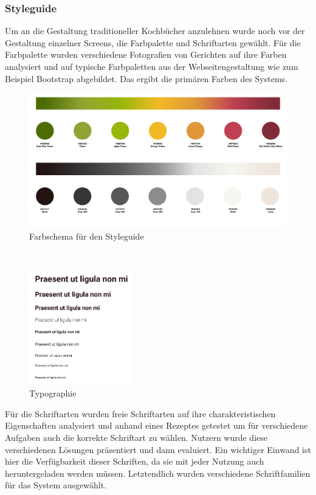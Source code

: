 \subsubsection{Styleguide}
Um an die Gestaltung traditioneller Kochbücher anzulehnen wurde noch vor der Gestaltung einzelner Screens, die Farbpalette und Schriftarten gewählt. Für die Farbpalette wurden verschiedene Fotografien von Gerichten auf ihre Farben analysiert und auf typische Farbpaletten aus der Webseitengestaltung wie zum Beispiel Bootstrap abgebildet. Das ergibt die primären Farben des Systems.  \\
\begin{figure}[h] %
    \includegraphics[width=1\textwidth]{images/colorscheme.png}
    \caption[Farbschema für den Styleguide]{Farbschema für den Styleguide}
    \label{fig:styleguide-colorscheme}
\end{figure}
\\
\begin{figure}
  \centering
    \includegraphics[width=0.4\textwidth]{images/typographie.png}
  \centering
\caption[Typographie]{Typographie}
\label{fig:styleguide-typographie}
\end{figure}
Für die Schriftarten wurden freie Schriftarten auf ihre charakteristischen Eigenschaften analysiert und anhand eines Rezeptes getestet um für verschiedene Aufgaben auch die korrekte Schriftart zu wählen. Nutzern wurde diese verschiedenen Lösungen präsentiert und dann evaluiert. Ein wichtiger Einwand ist hier die Verfügbarkeit dieser Schriften, da sie mit jeder Nutzung auch heruntergeladen werden müssen. Letztendlich wurden verschiedene Schriftfamilien für das System ausgewählt. \\
